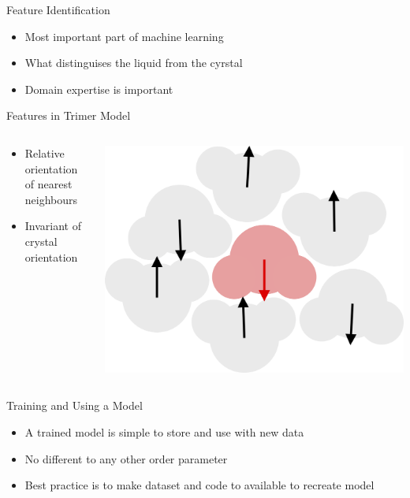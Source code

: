 \documentclass[aspectratio=169, 14pt]{beamer}
\begin{document}
\begin{frame}{Feature Identification}

  \begin{itemize}
    \item Most important part of machine learning
    \item What distinguises the liquid from the cyrstal
    \item Domain expertise is important
  \end{itemize}

\end{frame}


\begin{frame}{Features in Trimer Model}

  \begin{columns}
    \begin{column}{0.5\textwidth}
      \begin{itemize}
        \item Relative orientation of nearest neighbours
        \item Invariant of crystal orientation
      \end{itemize}
    \end{column}
    \begin{column}{0.5\textwidth}
      \includegraphics[width=\textwidth]{orientations.png}
    \end{column}
  \end{columns}
\end{frame}


\begin{frame}{Training and Using a Model}

  \begin{itemize}
    \item A trained model is simple to store and use with new data
    \item No different to any other order parameter
    \item Best practice is to make dataset and code to available to recreate model
  \end{itemize}

\end{frame}
\end{document}
